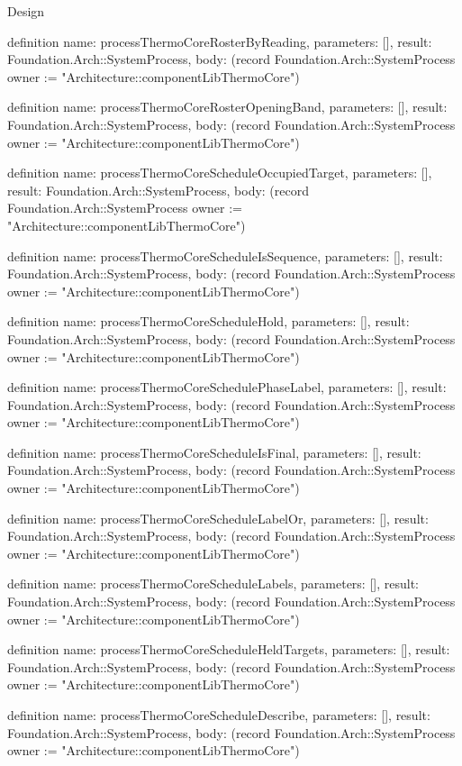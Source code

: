 \begin{lexlean}{Design}
\begin{semanticmodule}
definition{
  name: processThermoCoreRosterByReading,
  parameters: [],
  result: Foundation.Arch::SystemProcess,
  body: (record Foundation.Arch::SystemProcess {owner := "Architecture::componentLibThermoCore"})
}

definition{
  name: processThermoCoreRosterOpeningBand,
  parameters: [],
  result: Foundation.Arch::SystemProcess,
  body: (record Foundation.Arch::SystemProcess {owner := "Architecture::componentLibThermoCore"})
}

definition{
  name: processThermoCoreScheduleOccupiedTarget,
  parameters: [],
  result: Foundation.Arch::SystemProcess,
  body: (record Foundation.Arch::SystemProcess {owner := "Architecture::componentLibThermoCore"})
}

definition{
  name: processThermoCoreScheduleIsSequence,
  parameters: [],
  result: Foundation.Arch::SystemProcess,
  body: (record Foundation.Arch::SystemProcess {owner := "Architecture::componentLibThermoCore"})
}

definition{
  name: processThermoCoreScheduleHold,
  parameters: [],
  result: Foundation.Arch::SystemProcess,
  body: (record Foundation.Arch::SystemProcess {owner := "Architecture::componentLibThermoCore"})
}

definition{
  name: processThermoCoreSchedulePhaseLabel,
  parameters: [],
  result: Foundation.Arch::SystemProcess,
  body: (record Foundation.Arch::SystemProcess {owner := "Architecture::componentLibThermoCore"})
}

definition{
  name: processThermoCoreScheduleIsFinal,
  parameters: [],
  result: Foundation.Arch::SystemProcess,
  body: (record Foundation.Arch::SystemProcess {owner := "Architecture::componentLibThermoCore"})
}

definition{
  name: processThermoCoreScheduleLabelOr,
  parameters: [],
  result: Foundation.Arch::SystemProcess,
  body: (record Foundation.Arch::SystemProcess {owner := "Architecture::componentLibThermoCore"})
}

definition{
  name: processThermoCoreScheduleLabels,
  parameters: [],
  result: Foundation.Arch::SystemProcess,
  body: (record Foundation.Arch::SystemProcess {owner := "Architecture::componentLibThermoCore"})
}

definition{
  name: processThermoCoreScheduleHeldTargets,
  parameters: [],
  result: Foundation.Arch::SystemProcess,
  body: (record Foundation.Arch::SystemProcess {owner := "Architecture::componentLibThermoCore"})
}

definition{
  name: processThermoCoreScheduleDescribe,
  parameters: [],
  result: Foundation.Arch::SystemProcess,
  body: (record Foundation.Arch::SystemProcess {owner := "Architecture::componentLibThermoCore"})
}


\end{semanticmodule}
\end{lexlean}
